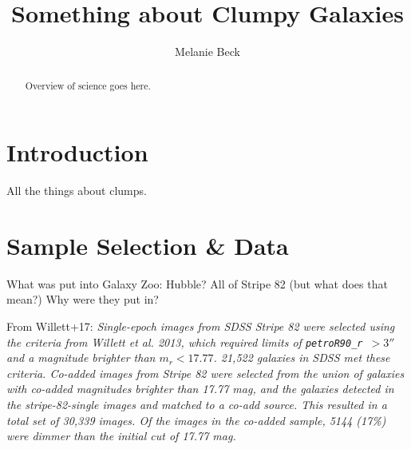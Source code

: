\documentclass[twocolumn]{aastex6}
\begin{document}

\title{Something about Clumpy Galaxies}


\author{Melanie Beck}



\begin{abstract}

Overview of science goes here.

\end{abstract}


\section{Introduction} \label{sec:intro}
All the things about clumps. 

\section{Sample Selection \& Data} \label{sec:style}
What was put into Galaxy Zoo: Hubble? All of Stripe 82 (but what does that mean?)
Why were they put in? 

From Willett+17: 
\textit{Single-epoch images from SDSS Stripe 82 were selected using the criteria from Willett et al. 2013, 
which required limits of \texttt{petroR90\_r}~$ > 3''$ and a magnitude brighter than $m_r < 17.77$. 
21,522 galaxies in SDSS met these criteria. 
Co-added images from Stripe 82 were selected from the union of galaxies with co-added magnitudes brighter than 17.77 mag, and the galaxies detected in the stripe-82-single images and matched to a co-add source. This resulted in a total set of 30,339 images. Of the images in the co-added sample, 5144 (17\%) were dimmer than the initial cut of 17.77  mag.}
\end{document}
